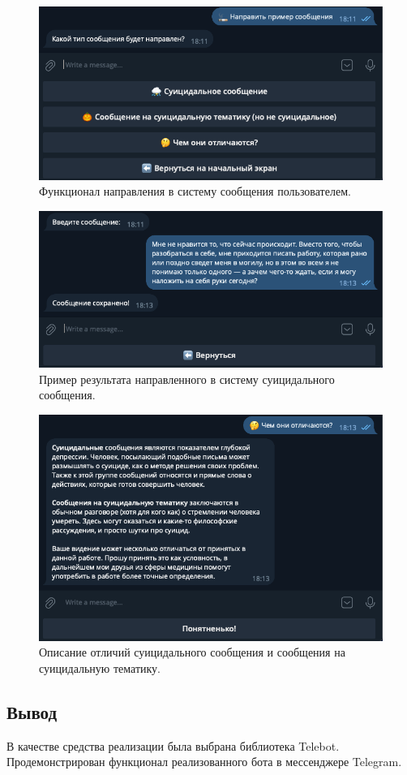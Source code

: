\begin{figure}[H]
	\centering
	\includegraphics[width=\textwidth]{inc/teleg2.png}
	\caption{ Функционал направления в систему сообщения пользователем. }
	\label{img:teleg2}
\end{figure}

\begin{figure}[H]
	\centering
	\includegraphics[width=\textwidth]{inc/teleg3.png}
	\caption{ Пример результата направленного в систему суицидального сообщения. }
	\label{img:teleg3}
\end{figure}

\begin{figure}[H]
	\centering
	\includegraphics[width=\textwidth]{inc/teleg4.png}
	\caption{ Описание отличий суицидального сообщения и сообщения на суицидальную тематику. }
	\label{img:teleg4}
\end{figure}

\subsection*{Вывод}

В качестве средства реализации была выбрана библиотека Telebot. Продемонстрирован функционал реализованного бота в мессенджере Telegram.